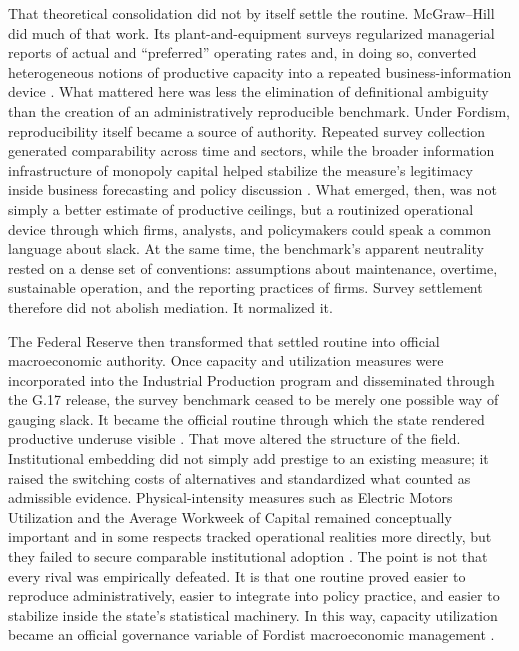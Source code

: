 \documentclass[11pt,a4paper]{article}
\begin{document}
That theoretical consolidation did not by itself settle the routine. McGraw--Hill did much of that work. Its plant-and-equipment surveys regularized managerial reports of actual and ``preferred'' operating rates and, in doing so, converted heterogeneous notions of productive capacity into a repeated business-information device \citep{Butler1958,Phillips1963}. What mattered here was less the elimination of definitional ambiguity than the creation of an administratively reproducible benchmark. Under Fordism, reproducibility itself became a source of authority. Repeated survey collection generated comparability across time and sectors, while the broader information infrastructure of monopoly capital helped stabilize the measure’s legitimacy inside business forecasting and policy discussion \citep{BaranSweezy1988,Munroe2007}. What emerged, then, was not simply a better estimate of productive ceilings, but a routinized operational device through which firms, analysts, and policymakers could speak a common language about slack. At the same time, the benchmark’s apparent neutrality rested on a dense set of conventions: assumptions about maintenance, overtime, sustainable operation, and the reporting practices of firms. Survey settlement therefore did not abolish mediation. It normalized it.


The Federal Reserve then transformed that settled routine into official macroeconomic authority. Once capacity and utilization measures were incorporated into the Industrial Production program and disseminated through the G.17 release, the survey benchmark ceased to be merely one possible way of gauging slack. It became the official routine through which the state rendered productive underuse visible \citep{Board2017}. That move altered the structure of the field. Institutional embedding did not simply add prestige to an existing measure; it raised the switching costs of alternatives and standardized what counted as admissible evidence. Physical-intensity measures such as Electric Motors Utilization and the Average Workweek of Capital remained conceptually important and in some respects tracked operational realities more directly, but they failed to secure comparable institutional adoption \citep{Foss1963,TaubmanGottschalk1971}. The point is not that every rival was empirically defeated. It is that one routine proved easier to reproduce administratively, easier to integrate into policy practice, and easier to stabilize inside the state’s statistical machinery. In this way, capacity utilization became an official governance variable of Fordist macroeconomic management \citep{Jessop2003}.
\end{document}

